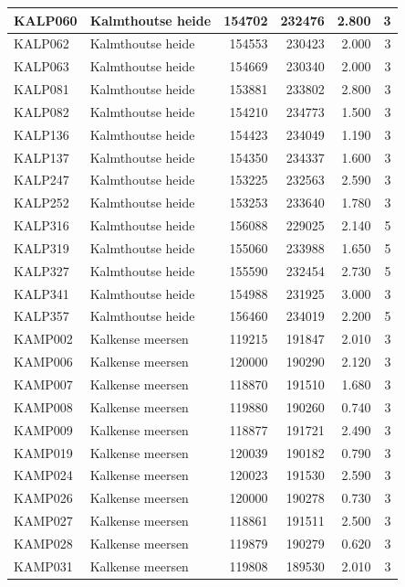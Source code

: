 \documentclass[11pt,]{book}
\begin{document}
\begin{table}
\begin{tabular}[t]{l|l|r|r|r|r}
\hline
KALP060 & Kalmthoutse heide & 154702 & 232476 & 2.800 & 3\\
\hline
KALP062 & Kalmthoutse heide & 154553 & 230423 & 2.000 & 3\\
\hline
KALP063 & Kalmthoutse heide & 154669 & 230340 & 2.000 & 3\\
\hline
KALP081 & Kalmthoutse heide & 153881 & 233802 & 2.800 & 3\\
\hline
KALP082 & Kalmthoutse heide & 154210 & 234773 & 1.500 & 3\\
\hline
KALP136 & Kalmthoutse heide & 154423 & 234049 & 1.190 & 3\\
\hline
KALP137 & Kalmthoutse heide & 154350 & 234337 & 1.600 & 3\\
\hline
KALP247 & Kalmthoutse heide & 153225 & 232563 & 2.590 & 3\\
\hline
KALP252 & Kalmthoutse heide & 153253 & 233640 & 1.780 & 3\\
\hline
KALP316 & Kalmthoutse heide & 156088 & 229025 & 2.140 & 5\\
\hline
KALP319 & Kalmthoutse heide & 155060 & 233988 & 1.650 & 5\\
\hline
KALP327 & Kalmthoutse heide & 155590 & 232454 & 2.730 & 5\\
\hline
KALP341 & Kalmthoutse heide & 154988 & 231925 & 3.000 & 3\\
\hline
KALP357 & Kalmthoutse heide & 156460 & 234019 & 2.200 & 5\\
\hline
KAMP002 & Kalkense meersen & 119215 & 191847 & 2.010 & 3\\
\hline
KAMP006 & Kalkense meersen & 120000 & 190290 & 2.120 & 3\\
\hline
KAMP007 & Kalkense meersen & 118870 & 191510 & 1.680 & 3\\
\hline
KAMP008 & Kalkense meersen & 119880 & 190260 & 0.740 & 3\\
\hline
KAMP009 & Kalkense meersen & 118877 & 191721 & 2.490 & 3\\
\hline
KAMP019 & Kalkense meersen & 120039 & 190182 & 0.790 & 3\\
\hline
KAMP024 & Kalkense meersen & 120023 & 191530 & 2.590 & 3\\
\hline
KAMP026 & Kalkense meersen & 120000 & 190278 & 0.730 & 3\\
\hline
KAMP027 & Kalkense meersen & 118861 & 191511 & 2.500 & 3\\
\hline
KAMP028 & Kalkense meersen & 119879 & 190279 & 0.620 & 3\\
\hline
KAMP031 & Kalkense meersen & 119808 & 189530 & 2.010 & 3\\

\end{tabular}
\end{table}
\end{document}
